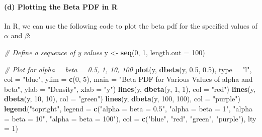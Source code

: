 \documentclass[
]{article}
\newenvironment{Shaded}{\begin{snugshade}}{\end{snugshade}}
\newcommand{\AttributeTok}[1]{\textcolor[rgb]{0.13,0.29,0.53}{#1}}
\newcommand{\CommentTok}[1]{\textcolor[rgb]{0.56,0.35,0.01}{\textit{#1}}}
\newcommand{\DecValTok}[1]{\textcolor[rgb]{0.00,0.00,0.81}{#1}}
\newcommand{\FloatTok}[1]{\textcolor[rgb]{0.00,0.00,0.81}{#1}}
\newcommand{\FunctionTok}[1]{\textcolor[rgb]{0.13,0.29,0.53}{\textbf{#1}}}
\newcommand{\NormalTok}[1]{#1}
\newcommand{\OtherTok}[1]{\textcolor[rgb]{0.56,0.35,0.01}{#1}}
\newcommand{\StringTok}[1]{\textcolor[rgb]{0.31,0.60,0.02}{#1}}
\begin{document}
\hypertarget{d-plotting-the-beta-pdf-in-r}{%
\paragraph{(d) Plotting the Beta PDF in
R}\label{d-plotting-the-beta-pdf-in-r}}

In R, we can use the following code to plot the beta pdf for the
specified values of \(\alpha\) and \(\beta\):

\begin{Shaded}
\begin{Highlighting}[]
\CommentTok{\# Define a sequence of y values}
\NormalTok{y }\OtherTok{\textless{}{-}} \FunctionTok{seq}\NormalTok{(}\DecValTok{0}\NormalTok{, }\DecValTok{1}\NormalTok{, }\AttributeTok{length.out =} \DecValTok{100}\NormalTok{)}

\CommentTok{\# Plot for alpha = beta = 0.5, 1, 10, 100}
\FunctionTok{plot}\NormalTok{(y, }\FunctionTok{dbeta}\NormalTok{(y, }\FloatTok{0.5}\NormalTok{, }\FloatTok{0.5}\NormalTok{), }\AttributeTok{type =} \StringTok{"l"}\NormalTok{, }\AttributeTok{col =} \StringTok{"blue"}\NormalTok{, }\AttributeTok{ylim =} \FunctionTok{c}\NormalTok{(}\DecValTok{0}\NormalTok{, }\DecValTok{5}\NormalTok{),}
     \AttributeTok{main =} \StringTok{"Beta PDF for Various Values of alpha and beta"}\NormalTok{,}
     \AttributeTok{ylab =} \StringTok{"Density"}\NormalTok{, }\AttributeTok{xlab =} \StringTok{"y"}\NormalTok{)}
\FunctionTok{lines}\NormalTok{(y, }\FunctionTok{dbeta}\NormalTok{(y, }\DecValTok{1}\NormalTok{, }\DecValTok{1}\NormalTok{), }\AttributeTok{col =} \StringTok{"red"}\NormalTok{)}
\FunctionTok{lines}\NormalTok{(y, }\FunctionTok{dbeta}\NormalTok{(y, }\DecValTok{10}\NormalTok{, }\DecValTok{10}\NormalTok{), }\AttributeTok{col =} \StringTok{"green"}\NormalTok{)}
\FunctionTok{lines}\NormalTok{(y, }\FunctionTok{dbeta}\NormalTok{(y, }\DecValTok{100}\NormalTok{, }\DecValTok{100}\NormalTok{), }\AttributeTok{col =} \StringTok{"purple"}\NormalTok{)}
\FunctionTok{legend}\NormalTok{(}\StringTok{"topright"}\NormalTok{, }\AttributeTok{legend =} \FunctionTok{c}\NormalTok{(}\StringTok{"alpha = beta = 0.5"}\NormalTok{, }\StringTok{"alpha = beta = 1"}\NormalTok{,}
                              \StringTok{"alpha = beta = 10"}\NormalTok{, }\StringTok{"alpha = beta = 100"}\NormalTok{),}
       \AttributeTok{col =} \FunctionTok{c}\NormalTok{(}\StringTok{"blue"}\NormalTok{, }\StringTok{"red"}\NormalTok{, }\StringTok{"green"}\NormalTok{, }\StringTok{"purple"}\NormalTok{), }\AttributeTok{lty =} \DecValTok{1}\NormalTok{)}
\end{Highlighting}
\end{Shaded}
\end{document}

